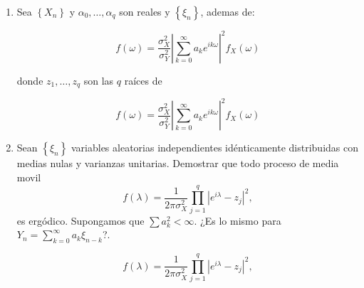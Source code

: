 \documentclass[a4paper, 12pt]{article}
\newcommand{\pts}[1]{\reversemarginpar\marginnote{ (#1 pts) }}
\begin{document}
\begin{enumerate}[labelwidth=0pt, align=left, leftmargin=*]
    
    
    
    
    
    \item \pts{5} Sea $\left\{X_n\right\}$ y $\alpha_0, \ldots, \alpha_q$ son reales y $\left\{\xi_n\right\}$, ademas de:

    $$
        f(\omega)=\frac{\sigma_X^2}{\sigma_Y^2}\left|\sum_{k=0}^{\infty} a_k e^{i k \omega}\right|^2 f_X(\omega)
    $$
     


    
    donde $z_1, \ldots, z_q$ son las $q$ raíces de
    
    $$
        f(\omega)=\frac{\sigma_X^2}{\sigma_Y^2}\left|\sum_{k=0}^{\infty} a_k e^{i k \omega}\right|^2 f_X(\omega)
    $$
     
    
    
    
    
    \item \pts{5} Sean $\left\{\xi_n\right\}$  variables aleatorias independientes idénticamente distribuidas con medias nulas y varianzas unitarias. Demostrar que todo proceso de media movil
        $$
        f(\lambda)=\frac{1}{2 \pi \sigma_X^2} \prod_{j=1}^q\left|e^{i \lambda}-z_j\right|^2,
        $$
    es ergódico. Supongamos que $\displaystyle \sum a_k^2<\infty$. ¿Es lo mismo para $\displaystyle Y_n=\sum_{k=0}^{\infty} a_k \xi_{n-k}$?.

        $$
        f(\lambda)=\frac{1}{2 \pi \sigma_X^2} \prod_{j=1}^q\left|e^{i \lambda}-z_j\right|^2,
        $$


        
    








\end{enumerate}






\end{document}
